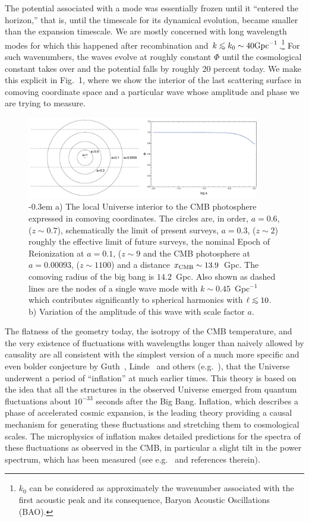 \documentclass[psfig,12pt]{article}
\def\ni{\noindent}
\def\lo{\mathrel{\raise.3ex\hbox{$<$}\mkern-14mu\lower0.6ex\hbox{$\sim$}}}
\begin{document}
The potential associated with a mode was essentially frozen until it
``entered the horizon,'' that is, until the timescale for its dynamical
evolution, became smaller than the expansion timescale. We are mostly
concerned with long wavelength modes for which this happened after
recombination and $k\lo k_0\sim40{\rm Gpc}^{-1}$.\footnote{$k_0$ can be
considered as approximately the wavenumber associated with the first
acoustic peak and its consequence, Baryon Acoustic Oscillations (BAO).}
For such wavenumbers, the waves evolve at roughly constant $\Phi$ until
the cosmological constant takes over and the potential falls by roughly
20 percent today. We make this explicit in Fig.~1, where we show the
interior of the last scattering surface in comoving coordinate space and
a particular wave whose amplitude and phase we are trying to measure.
\begin{figure}[t]
\centering
\includegraphics[width=4in]{figures/nsffig1.pdf}
\caption{ \openup -0.3em
\footnotesize{a) The local Universe interior to the CMB photosphere
expressed in comoving coordinates. The circles are, in order, $a=0.6$,
($z\sim0.7$), schematically the limit of present surveys, $a=0.3$,
($z\sim2$) roughly the effective limit of future surveys, the nominal
Epoch of Reionization at $a=0.1$, ($z\sim9$ and the CMB photosphere at
$a=0.00093$, ($z\sim1100$) and a distance $x_{\rm CMB}\sim13.9$~Gpc. The
comoving radius of the big bang is $14.2$~Gpc. Also shown as dashed
lines are the nodes of a single wave mode with $k\sim0.45$~Gpc$^{-1}$
which contributes significantly to spherical harmonics with $\ell\lo10$.
b) Variation of the amplitude of this wave with scale factor $a$.}}
\end{figure}

\ni{\bf The Inflation of Our Universe:} The flatness of the geometry today, the isotropy of
the CMB temperature, and the very existence of fluctuations with
wavelengths longer than naively allowed by causality are all consistent
with the simplest version of a much more specific and even bolder
conjecture by Guth~\cite{Guth1981}, Linde~\cite{Linde1982a} and others
(e.g.~\cite{Mukhanov:1981xt, Sato1981, Hawking1982, Starobinsky1982,
Albrecht1982, Bardeen1983}), that the Universe underwent a period of
``inflation'' at much earlier times. This theory is based on the idea
that all the structures in the observed Universe emerged from quantum
fluctuations about $10^{-33}$ seconds after the Big Bang. Inflation,
which describes a phase of accelerated cosmic expansion, is the leading
theory providing a causal mechanism for generating these fluctuations
and stretching them to cosmological scales. The microphysics of
inflation makes detailed predictions for the spectra of these
fluctuations as observed in the CMB, in particular a slight tilt in the
power spectrum, which has been measured (see e.g.~\cite{Malik2008,
Gordon2000} and references therein).
\end{document}
